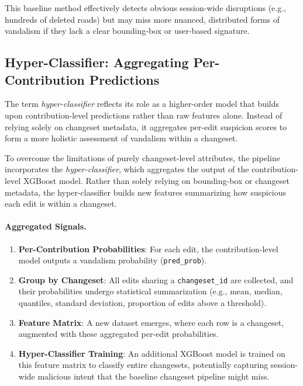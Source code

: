 \documentclass[
    13pt, %
    a4paper, %
    listof=totoc, %
    bibliography=totoc, %
    index=totoc, %
    headsepline
]{scrreprt}
\begin{document}
This baseline method effectively detects obvious session-wide disruptions (e.g., hundreds of deleted roads) but may miss more nuanced, distributed forms of vandalism if they lack a clear bounding-box or user-based signature.

\subsection{Hyper-Classifier: Aggregating Per-Contribution Predictions}
\label{subsec:hyper_classifier}

The term \emph{hyper-classifier} reflects its role as a higher-order model that builds upon contribution-level predictions rather than raw features alone. Instead of relying solely on changeset metadata, it aggregates per-edit suspicion scores to form a more holistic assessment of vandalism within a changeset.

To overcome the limitations of purely changeset-level attributes, the pipeline incorporates the \emph{hyper-classifier}, which aggregates the output of the contribution-level XGBoost model. Rather than solely relying on bounding-box or changeset metadata, the hyper-classifier builds new features summarizing how suspicious each edit is within a changeset.


\paragraph{Aggregated Signals.}
\begin{enumerate}
    \item \textbf{Per-Contribution Probabilities}: For each edit, the contribution-level model outputs a vandalism probability (\texttt{pred\_prob}).
    \item \textbf{Group by Changeset}: All edits sharing a \texttt{changeset\_id} are collected, and their probabilities undergo statistical summarization (e.g., mean, median, quantiles, standard deviation, proportion of edits above a threshold). 
    \item \textbf{Feature Matrix}: A new dataset emerges, where each row is a changeset, augmented with these aggregated per-edit probabilities. 
    \item \textbf{Hyper-Classifier Training}: An additional XGBoost model is trained on this feature matrix to classify entire changesets, potentially capturing session-wide malicious intent that the baseline changeset pipeline might miss.
\end{enumerate}
\end{document}
